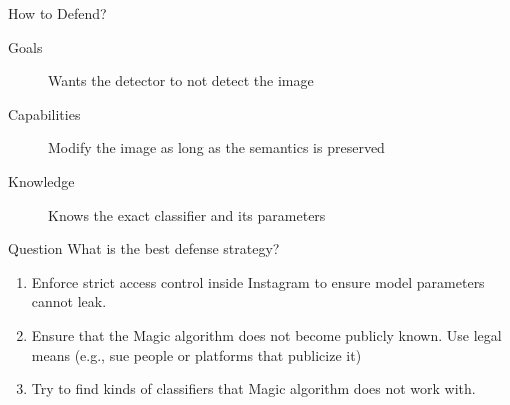 \documentclass[10pt]{beamer}
\begin{document}
\begin{frame}[fragile]{How to Defend?}
  \begin{description}
    \item[Goals] Wants the detector to not detect the image
    \item[Capabilities] Modify the image as long as the semantics is preserved
    \item[Knowledge] Knows the exact classifier and its parameters
  \end{description}

  \begin{alertblock}{Question}
    What is the best defense strategy?
  \end{alertblock}

    \begin{enumerate}
      \item Enforce strict access control inside Instagram to ensure model parameters cannot leak.
      \item Ensure that the \textsf{Magic} algorithm does not become publicly known. Use legal
        means (e.g., sue people or platforms that publicize it)
      \item Try to find kinds of classifiers that \textsf{Magic} algorithm does not work with.
    \end{enumerate}
\end{frame}
\end{document}
